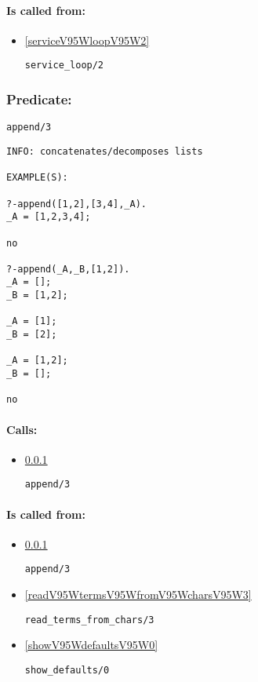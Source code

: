 \paragraph{Is called from:} 
\begin{itemize}
\item \ref{serviceV95WloopV95W2} 
\begin{verbatim}
service_loop/2
\end{verbatim}

\end{itemize}

\subsubsection{Predicate:} \label{appendV95W3}

\begin{verbatim}
append/3
\end{verbatim}

{\small \begin{verbatim}
INFO: concatenates/decomposes lists

EXAMPLE(S):

?-append([1,2],[3,4],_A).
_A = [1,2,3,4];

no

?-append(_A,_B,[1,2]).
_A = [];
_B = [1,2];

_A = [1];
_B = [2];

_A = [1,2];
_B = [];

no

\end{verbatim}}
\paragraph{Calls:} 
\begin{itemize}
\item \ref{appendV95W3} 
\begin{verbatim}
append/3
\end{verbatim}

\end{itemize}
\paragraph{Is called from:} 
\begin{itemize}
\item \ref{appendV95W3} 
\begin{verbatim}
append/3
\end{verbatim}

\item \ref{readV95WtermsV95WfromV95WcharsV95W3} 
\begin{verbatim}
read_terms_from_chars/3
\end{verbatim}

\item \ref{showV95WdefaultsV95W0} 
\begin{verbatim}
show_defaults/0
\end{verbatim}

\end{itemize}

